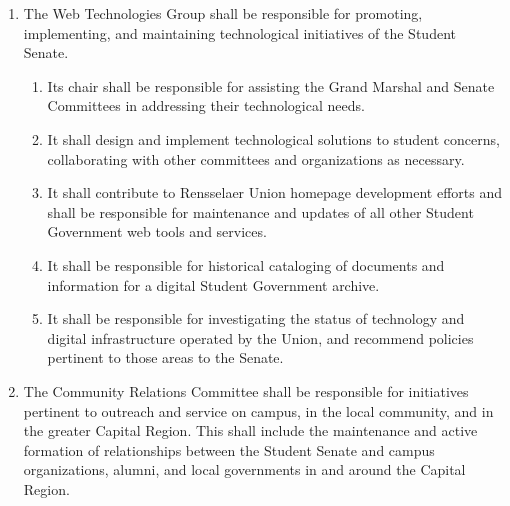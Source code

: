 \begin{enumerate}
\begin{enumerate}
  \item It shall address issues pertaining to student rights and responsibilities as they arise.
    \begin{enumerate}
    \item It shall work with the Dean of Students to discuss pending changes to the Handbook of Student Rights and Responsibilities, or other relevant policies that affect student rights.
    \end{enumerate}
  \item It shall take steps to remedy student concerns regarding student life.
    \begin{enumerate}
    \item It shall advise the administration on issues related to student life, and work with them in addressing these issues.
    \item It shall work and collaborate with the administration and other organizations to initiate new programs that improve the student experience.
    \end{enumerate}
  \end{enumerate}
\item The Web Technologies Group shall be responsible for promoting, implementing, and maintaining technological initiatives of the Student Senate.
  \begin{enumerate}
  \item Its chair shall be responsible for assisting the Grand Marshal and Senate Committees in addressing their technological needs.
  \item It shall design and implement technological solutions to student concerns, collaborating with other committees and organizations as necessary.
  \item It shall contribute to Rensselaer Union homepage development efforts and shall be responsible for maintenance and updates of all other Student Government web tools and services.
  \item It shall be responsible for historical cataloging of documents and information for a digital Student Government archive.
  \item It shall be responsible for investigating the status of technology and digital infrastructure operated by the Union, and recommend policies pertinent to those areas to the Senate.
  \end{enumerate}
\item The Community Relations Committee shall be responsible for initiatives pertinent to outreach and service on campus, in the local community, and in the greater Capital Region. This shall include the maintenance and active formation of relationships between the Student Senate and campus organizations, alumni, and local governments in and around the Capital Region.
\end{enumerate}

